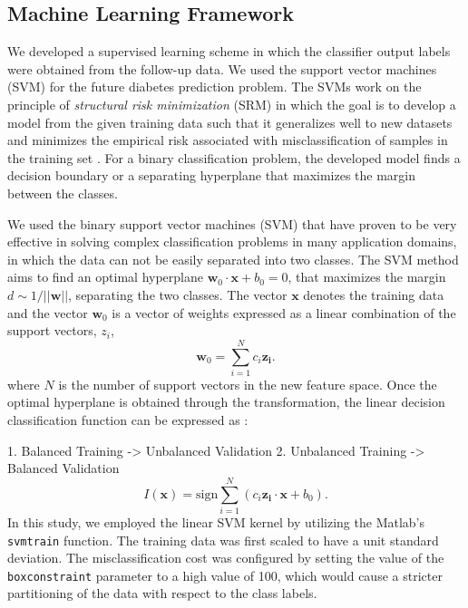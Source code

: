 \documentclass[journal,comsoc]{IEEEtran}
\begin{document}
\subsection{Machine Learning Framework}
%
We developed a supervised learning scheme in which the classifier output labels were obtained from the follow-up data.  We used the support vector machines (SVM) for the future diabetes prediction problem. The SVMs work on the principle of \emph{structural risk minimization} (SRM) in which the goal is to develop a model from the given training data such that it generalizes well to new datasets and minimizes the empirical risk associated with misclassification of samples in the training set \cite{vapnik_nature_2000,vapnik2015uniform}. For a binary classification problem, the developed model finds a decision boundary or a separating hyperplane that maximizes the margin between the classes.

We used the binary support vector machines (SVM) that have proven to be very effective in solving complex classification problems in many application domains, in which the data can not be easily separated into two classes. The SVM method aims to find an optimal hyperplane $\mathbf{w}_{0}\cdot \mathbf{x} + b_{0} = 0$, that maximizes the margin $d \sim 1/||\mathbf{w}||$, separating the two classes. The vector $\mathbf{x}$ denotes the training data and the vector $\mathbf{w}_0$ is a vector of weights expressed as a linear combination of the support vectors, $z_i$,
%
\begin{equation}
    \mathbf{w}_0 = \sum ^{N}_{i=1} c_i \mathbf{z_i}.
\end{equation}
%
where $N$ is the number of support vectors in the new feature space. Once the optimal hyperplane is obtained through the transformation, the linear decision classification function can be expressed as \cite{cortes1995support}:

1. Balanced Training -> Unbalanced Validation
2. Unbalanced Training -> Balanced Validation
%
\begin{equation}
    I(\mathbf{x}) = \mathrm{sign} \sum_{i = 1}^{N} \left( c_i \mathbf{z_i} \cdot \mathbf{x} + b_{0} \right).
\end{equation}
%
In this study, we employed the linear SVM kernel by utilizing the Matlab's \texttt{svmtrain} function. The training data was first scaled to have a unit standard deviation. The misclassification cost was configured by setting the value of the \texttt{boxconstraint} parameter to a high value of \num{100}, which would cause a stricter partitioning of the data with respect to the class labels.
\end{document}
